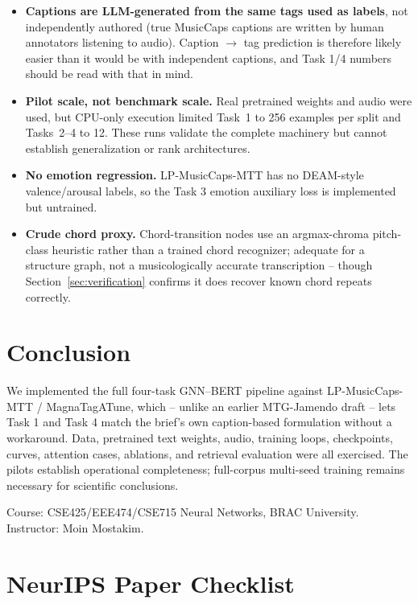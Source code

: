 \documentclass{article}
\begin{document}
\begin{itemize}
  \item \textbf{Captions are LLM-generated from the same tags used as
    labels}, not independently authored (true MusicCaps captions are
    written by human annotators listening to audio). Caption $\to$ tag
    prediction is therefore likely easier than it would be with independent
    captions, and Task 1/4 numbers should be read with that in mind.
  \item \textbf{Pilot scale, not benchmark scale.} Real pretrained weights
    and audio were used, but CPU-only execution limited Task~1 to 256
    examples per split and Tasks~2--4 to 12. These runs validate the complete
    machinery but cannot establish generalization or rank architectures.
  \item \textbf{No emotion regression.} LP-MusicCaps-MTT has no DEAM-style
    valence/arousal labels, so the Task 3 emotion auxiliary loss is
    implemented but untrained.
  \item \textbf{Crude chord proxy.} Chord-transition nodes use an
    argmax-chroma pitch-class heuristic rather than a trained chord
    recognizer; adequate for a structure graph, not a musicologically
    accurate transcription -- though Section~\ref{sec:verification}
    confirms it does recover known chord repeats correctly.
\end{itemize}

\section{Conclusion}

We implemented the full four-task GNN--BERT pipeline against
LP-MusicCaps-MTT / MagnaTagATune, which -- unlike an earlier MTG-Jamendo
draft -- lets Task 1 and Task 4 match the brief's own caption-based
formulation without a workaround. Data, pretrained text weights, audio,
training loops, checkpoints, curves, attention cases, ablations, and
retrieval evaluation were all exercised. The pilots establish operational
completeness; full-corpus multi-seed training remains necessary for
scientific conclusions.

\begin{ack}
Course: CSE425/EEE474/CSE715 Neural Networks, BRAC University. Instructor: Moin Mostakim.
\end{ack}




\newpage
\section*{NeurIPS Paper Checklist}
\end{document}
